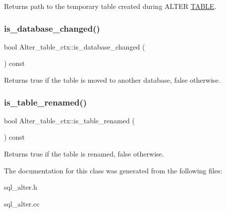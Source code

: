 \begin{DoxyReturn}{Returns}
path to the temporary table created during A\+L\+T\+ER \mbox{\hyperlink{structTABLE}{T\+A\+B\+LE}}. 
\end{DoxyReturn}
\mbox{\label{classAlter__table__ctx_a0afbe188b4e7c462c95cc9b61431b92a}} 
\subsubsection{\texorpdfstring{is\+\_\+database\+\_\+changed()}{is\_database\_changed()}}
{\footnotesize\ttfamily bool Alter\+\_\+table\+\_\+ctx\+::is\+\_\+database\+\_\+changed (\begin{DoxyParamCaption}{ }\end{DoxyParamCaption}) const\hspace{0.3cm}{\ttfamily [inline]}}

\begin{DoxyReturn}{Returns}
true if the table is moved to another database, false otherwise. 
\end{DoxyReturn}
\mbox{\label{classAlter__table__ctx_a3a3b9df562431de6681bd430b9ad556e}} 
\subsubsection{\texorpdfstring{is\+\_\+table\+\_\+renamed()}{is\_table\_renamed()}}
{\footnotesize\ttfamily bool Alter\+\_\+table\+\_\+ctx\+::is\+\_\+table\+\_\+renamed (\begin{DoxyParamCaption}{ }\end{DoxyParamCaption}) const\hspace{0.3cm}{\ttfamily [inline]}}

\begin{DoxyReturn}{Returns}
true if the table is renamed, false otherwise. 
\end{DoxyReturn}


The documentation for this class was generated from the following files\+:\begin{DoxyCompactItemize}
\item 
sql\+\_\+alter.\+h\item 
sql\+\_\+alter.\+cc\end{DoxyCompactItemize}
